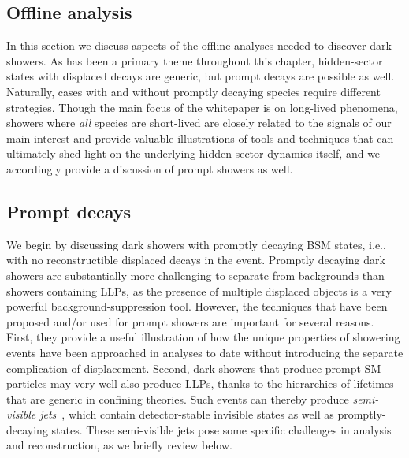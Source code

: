 \begin{enumerate}
\section{Offline analysis}
\label{sec:darkshowerreco}

In this section we discuss aspects of the offline analyses needed to discover dark showers. As has been a primary theme throughout this chapter, hidden-sector states with displaced decays are generic, but prompt decays are possible as well. Naturally, cases with and without promptly decaying species require different strategies. Though the main focus of the whitepaper is on long-lived phenomena, showers where {\it all} species are short-lived are  closely related to the signals of our main interest and provide valuable illustrations of  tools and techniques that can ultimately shed light on the underlying hidden sector dynamics itself, and we accordingly provide a discussion of prompt showers as well.

\subsection{Prompt decays}
\label{sec:darkshowerprompt}

 We begin by discussing dark showers with promptly decaying BSM states, i.e., with no reconstructible displaced decays in the event.  Promptly decaying dark showers are substantially more challenging to separate from backgrounds than showers containing LLPs, as the presence of multiple displaced objects is a very powerful background-suppression tool.  However, the techniques that have been proposed and/or used for prompt showers are important for several reasons. First, they provide a useful illustration of how the unique properties of showering events have been approached in analyses to date without introducing the separate complication of displacement.  Second, dark showers that produce prompt SM particles may very well also produce LLPs, thanks to the hierarchies of lifetimes that are generic in confining theories.  Such events can thereby produce {\em semi-visible jets}~\cite{Cohen:2015toa}, which contain detector-stable invisible states as well as promptly-decaying states.  These semi-visible jets pose some specific challenges in analysis and reconstruction, as we briefly review below.


\end{enumerate}
